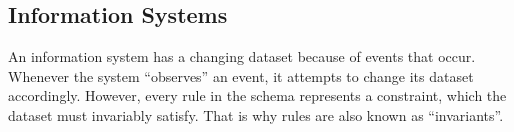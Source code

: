 \documentclass{elsarticle}
\begin{document}
   




\subsection{Information Systems}
\label{sct:Information Systems}
   An information system has a changing dataset because of events that occur.
   Whenever the system ``observes'' an event, it attempts to change its dataset accordingly.
   However, every rule in the schema represents a constraint,
   which the dataset must invariably satisfy.
   That is why rules are also known as ``invariants''.
\end{document}
